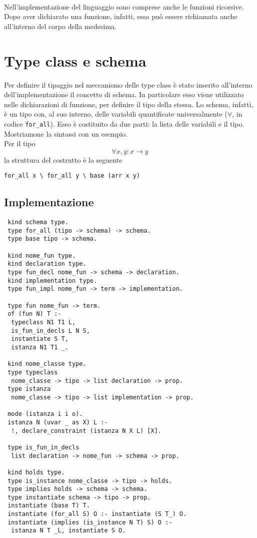 \documentclass[12pt,a4paper,openright,twoside]{report}
\begin{document}
\paragraph{}
Nell'implementazione del linguaggio sono comprese anche le funzioni ricorsive. Dopo aver dichiarato una funzione, infatti, essa può essere richiamata anche all'interno del corpo della medesima.

\section{Type class e schema}
Per definire il tipaggio nel meccanismo delle type class è stato inserito all'interno dell'implementazione il concetto di schema. In particolare esso viene utilizzato nelle dichiarazioni di funzione, per definire il tipo della stessa. Lo schema, infatti, è un tipo con, al suo interno, delle variabili quantificate universalmente ($\forall$, in codice \verb"for_all"). Esso è costituito da due parti: la lista delle variabili e il tipo.\\
Mostriamone la sintassi con un esempio.\\
Per il tipo
\begin{equation}
 \forall x,y : x \rightarrow y \label{eq:fax->y}
\end{equation}
la struttura del costrutto è la seguente
\begin{center}
 \verb"for_all x \ for_all y \ base (arr x y)"
\end{center}

\subsection{Implementazione}
\begin{verbatim}
 kind schema type.
 type for_all (tipo -> schema) -> schema.
 type base tipo -> schema.
 
 kind nome_fun type.
 kind declaration type.
 type fun_decl nome_fun -> schema -> declaration.
 kind implementation type.
 type fun_impl nome_fun -> term -> implementation.
 
 type fun nome_fun -> term.
 of (fun N) T :-
  typeclass N1 T1 L,
  is_fun_in_decls L N S,
  instantiate S T,
  istanza N1 T1 _.
 
 kind nome_classe type.
 type typeclass
  nome_classe -> tipo -> list declaration -> prop.
 type istanza
  nome_classe -> tipo -> list implementation -> prop.

 mode (istanza i i o).
 istanza N (uvar _ as X) L :-
  !, declare_constraint (istanza N X L) [X].
 
 type is_fun_in_decls
  list declaration -> nome_fun -> schema -> prop.
 
 kind holds type.
 type is_instance nome_classe -> tipo -> holds.
 type implies holds -> schema -> schema.
 type instantiate schema -> tipo -> prop.
 instantiate (base T) T.
 instantiate (for_all S) O :- instantiate (S T_) O.
 instantiate (implies (is_instance N T) S) O :-
  istanza N T _L, instantiate S O.
\end{verbatim}
\end{document}

